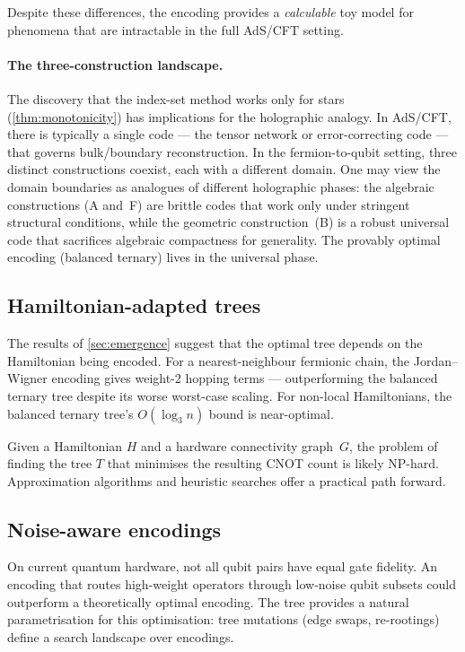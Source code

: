 Despite these differences, the encoding provides a \emph{calculable}
toy model for phenomena that are intractable in the full AdS/CFT
setting.

\paragraph{The three-construction landscape.}
The discovery that the index-set method works only for stars
(\cref{thm:monotonicity}) has implications for the holographic
analogy.  In AdS/CFT, there is typically a single code --- the
tensor network or error-correcting code --- that governs bulk/boundary
reconstruction.  In the fermion-to-qubit setting, three distinct
constructions coexist, each with a different domain.  One may view
the domain boundaries as analogues of different holographic phases:
the algebraic constructions (A and~F) are brittle codes that work
only under stringent structural conditions, while the geometric
construction~(B) is a robust universal code that sacrifices algebraic
compactness for generality.  The provably optimal encoding (balanced
ternary) lives in the universal phase.

\subsection{Hamiltonian-adapted trees}
\label{sec:disc-adapted}

The results of \cref{sec:emergence} suggest that the optimal tree
depends on the Hamiltonian being encoded.  For a nearest-neighbour
fermionic chain, the Jordan--Wigner encoding gives weight-2 hopping
terms — outperforming the balanced ternary tree despite its worse
worst-case scaling.  For non-local Hamiltonians, the balanced ternary
tree's $O(\log_3 n)$ bound is near-optimal.

Given a Hamiltonian $H$ and a hardware connectivity graph~$G$, the
problem of finding the tree $T$ that minimises the resulting CNOT count
is likely NP-hard.  Approximation algorithms and heuristic searches
\cite{loaiza2023,goings2023} offer a practical path forward.

\subsection{Noise-aware encodings}
\label{sec:disc-noise}

On current quantum hardware, not all qubit pairs have equal gate
fidelity.  An encoding that routes high-weight operators through
low-noise qubit subsets could outperform a theoretically optimal
encoding.  The tree provides a natural parametrisation for this
optimisation: tree mutations (edge swaps, re-rootings) define a search
landscape over encodings.

